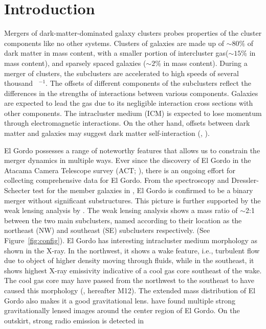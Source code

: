 \section{Introduction} 
Mergers of dark-matter-dominated galaxy clusters probes properties
of the cluster components like no other systems. 
Clusters of galaxies are made up of $\sim80\%$ of dark matter in mass content, 
with a smaller  portion of intercluster gas($\sim15\%$ in mass content), and
sparsely spaced galaxies ($\sim2\%$ in mass content). During a merger of
clusters, the subclusters are accelerated to high speeds of several
thousand \kilo \meter~\second$^{-1}$. The offsets of
different components of the subclusters reflect the differences in the
strengths of interactions between various components. Galaxies are
expected to lead the gas due to its negligible interaction cross
sections with other components. The intracluster medium (ICM) is expected to lose
momentum through electromagnetic interactions. On the other hand, offsets
between dark matter and galaxies may suggest dark matter self-interaction
(\citealt{Kahlhoefer14}, \citealt{Randall2008d}).  
\par
El Gordo possesses a range of noteworthy features that allows us to constrain
the merger dynamics in multiple ways.  Ever since the discovery of El Gordo
in the Atacama Camera Telescope survey (ACT; \citealt{Marriage11}), there is an ongoing effort for
collecting comprehensive data for El Gordo.
From the spectroscopy and Dressler-Schecter test for the member galaxies
in \cite{Sifon13}, El Gordo is confirmed to be a binary merger 
without significant substructures. This picture is further supported by the
weak lensing analysis by \cite{Jee13}. The weak lensing analysis shows
a mass ratio of $\sim$2:1  between the two main subclusters, named according to their location as the northeast (NW) and southeast (SE) subclusters respectively. 
(See Figure~\ref{fig:config}). El Gordo has interesting intracluster medium morphology as shown in the X-ray. In the northwest, it shows a wake feature, i.e.,
turbulent flow due to object of higher density moving through fluids, while in the southeast, it shows
highest X-ray emissivity indicative of a cool gas core southeast of the
wake. The cool gas core may have passed from the northwest to the southeast
to have caused this morphology (\citealt{M12}, hereafter M12). 
The extended mass distribution of El Gordo also makes it a good
gravitational lens. \cite{Zitrin13} have found multiple strong
gravitationally lensed images around the center region of El Gordo. 
On the outskirt, strong radio emission is detected in
